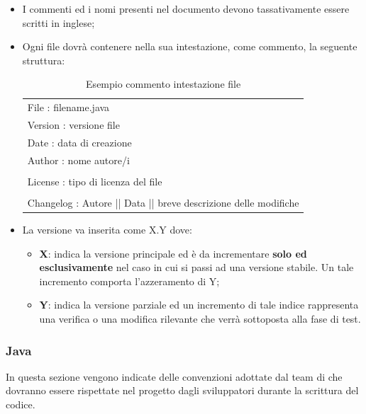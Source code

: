 \begin{itemize}
	\item I commenti ed i nomi presenti nel documento devono tassativamente essere scritti in inglese;
	\item Ogni file dovrà contenere nella sua intestazione, come commento, la seguente struttura:
\begin{table} [H]
	\begin{center}
		\begin{tabular}{| l |}
			\hline
			File : filename.java\\
			Version : versione file\\
			Date : data di creazione\\
			Author : nome autore/i\\
			\\
			License : tipo di licenza del file\\
			\\
			Changelog : Autore || Data || breve descrizione delle modifiche\\
			\hline
		\end{tabular}
	\end{center}
	\caption{Esempio commento intestazione file}
\end{table}
\end{itemize}

\begin{itemize}
	\item La versione va inserita come X.Y dove:
	\begin{itemize}
		\item \textbf{X}: indica la versione principale ed è da incrementare \textbf{solo ed esclusivamente} nel caso in cui si passi ad una versione stabile. Un tale incremento comporta l’azzeramento di Y;
		\item \textbf{Y}: indica la versione parziale ed un incremento di tale indice rappresenta una verifica o una modifica rilevante che verrà sottoposta alla fase di test.
	\end{itemize}
\end{itemize}
\subsubsection{Java}
In questa sezione vengono indicate delle convenzioni adottate dal team di 
 che dovranno essere rispettate nel progetto dagli sviluppatori durante la scrittura del codice.
